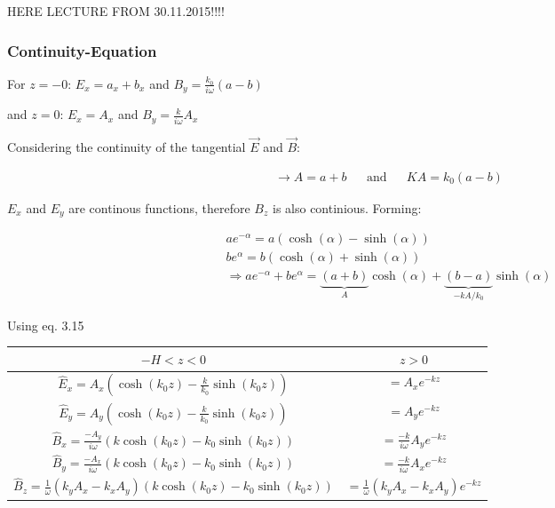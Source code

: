 HERE LECTURE FROM 30.11.2015!!!!

%
%
%
%
%
%


\subsubsection*{Continuity-Equation}
For $z=-0$: $E_x=a_x+b_x$ and $B_y=\frac{k_0}{i\omega}(a-b)$

and $z=0$: $E_x=A_x$ and $B_y=\frac{k}{i\omega}A_x$

Considering the continuity of the tangential $\vec{E}$ and $\vec{B}$:

\begin{align*}
\rightarrow A=a+b &&\textrm{and}&& KA=k_0(a-b)
\end{align*}

$E_x$ and $E_y$ are continous functions, therefore $B_z$ is also continious. Forming:

\begin{align*}
ae^{-\alpha}=a(\cosh(\alpha)-\sinh(\alpha))\\
be^{\alpha}=b(\cosh(\alpha)+\sinh(\alpha))\\
\Rightarrow ae^{-\alpha}+be^{\alpha}=\underbrace{(a+b)}_{A}\cosh(\alpha)+\underbrace{(b-a)}_{-kA/k_0}\sinh(\alpha)
\end{align*}

Using eq. 3.15

\begin{tabularx}{\textwidth}{c|c}
$-H<z<0$ &$z>0$ \\
\hline
$\hat{E}_x=A_x(\cosh(k_0z)-\frac{k}{k_0}\sinh(k_0z))$ & $=A_xe^{-kz}$ \\
$\hat{E}_y=A_y(\cosh(k_0z)-\frac{k}{k_0}\sinh(k_0z))$ & $=A_ye^{-kz}$ \\
$\hat{B}_x=\frac{-A_y}{i\omega}(k\cosh(k_0z)-k_0\sinh(k_0z))$ & $=\frac{-k}{i\omega} A_ye^{-kz}$ \\
$\hat{B}_y=\frac{-A_x}{i\omega}(k\cosh(k_0z)-k_0\sinh(k_0z))$ & $=\frac{-k}{i\omega} A_xe^{-kz}$ \\
$\hat{B}_z=\frac{1}{\omega}(k_yA_x-k_xA_y)(k\cosh(k_0z)-k_0\sinh(k_0z))$ & $=\frac{1}{\omega}(k_y A_x-k_xA_y)e^{-kz}$
\end{tabularx}

